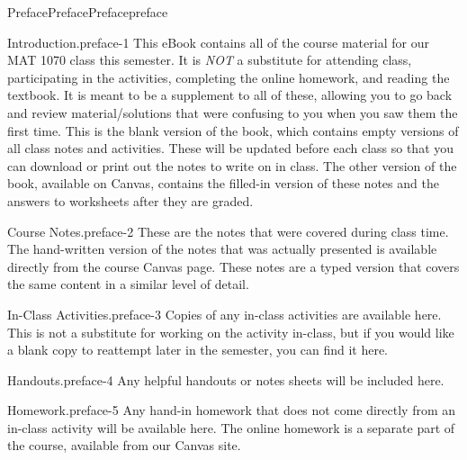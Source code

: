 \documentclass[twoside,14pt,]{extbook}
\begin{document}
\begin{preface}{Preface}{Preface}{}{Preface}{}{}{preface}
\begin{paragraphs}{Introduction.}{preface-1}%
This eBook contains all of the course material for our MAT 1070 class this semester. It is \emph{NOT} a substitute for attending class, participating in the activities, completing the online homework, and reading the textbook. It is meant to be a supplement to all of these, allowing you to go back and review material\slash{}solutions that were confusing to you when you saw them the first time. This is the blank version of the book, which contains empty versions of all class notes and activities. These will be updated before each class so that you can download or print out the notes to write on in class. The other version of the book, available on Canvas, contains the filled-in version of these notes and the answers to worksheets after they are graded.%
\end{paragraphs}%
\begin{paragraphs}{Course Notes.}{preface-2}%
These are the notes that were covered during class time. The hand-written version of the notes that was actually presented is available directly from the course Canvas page. These notes are a typed version that covers the same content in a similar level of detail.%
\end{paragraphs}%
\begin{paragraphs}{In-Class Activities.}{preface-3}%
Copies of any in-class activities are available here. This is not a substitute for working on the activity in-class, but if you would like a blank copy to reattempt later in the semester, you can find it here.%
\end{paragraphs}%
\begin{paragraphs}{Handouts.}{preface-4}%
Any helpful handouts or notes sheets will be included here.%
\end{paragraphs}%
\begin{paragraphs}{Homework.}{preface-5}%
Any hand-in homework that does not come directly from an in-class activity will be available here. The online homework is a separate part of the course, available from our Canvas site.%
\end{paragraphs}%
\end{preface}
\setcounter{tocdepth}{1}
\renewcommand*\contentsname{Contents}
\tableofcontents
\mainmatter
%
%
\typeout{************************************************}
\end{document}
